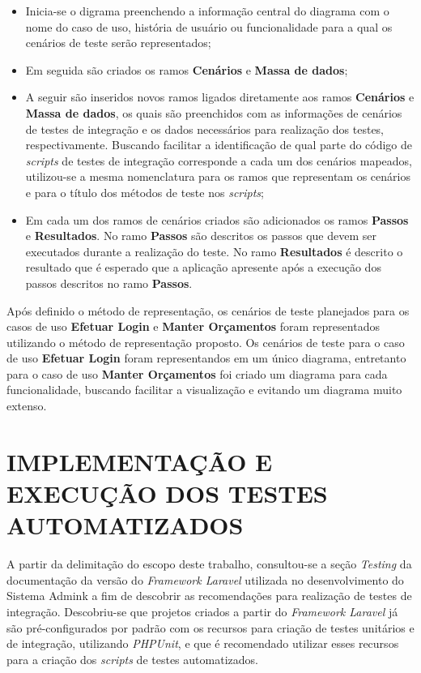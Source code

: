             \begin{itemize}
                \item Inicia-se o digrama preenchendo a informação central do diagrama com o nome do caso de uso, história de usuário ou funcionalidade para a qual os cenários de teste serão representados;
                \item Em seguida são criados os ramos \textbf{Cenários} e \textbf{Massa de dados};
                \item A seguir são inseridos novos ramos ligados diretamente aos ramos \textbf{Cenários} e \textbf{Massa de dados}, os quais são preenchidos com as informações de cenários de testes de integração e os dados necessários para realização dos testes, respectivamente. Buscando facilitar a identificação de qual parte do código de \emph{scripts} de testes de integração corresponde a cada um dos cenários mapeados, utilizou-se a mesma nomenclatura para os ramos que representam os cenários e para o título dos métodos de teste nos \emph{scripts};
                \item Em cada um dos ramos de cenários criados são adicionados os ramos \textbf{Passos} e \textbf{Resultados}. No ramo \textbf{Passos} são descritos os passos que devem ser executados durante a realização do teste. No ramo \textbf{Resultados} é descrito o resultado que é esperado que a aplicação apresente após a execução dos passos descritos no ramo \textbf{Passos}.
            \end{itemize}
        
            Após definido o método de representação, os cenários de teste planejados para os casos de uso \textbf{Efetuar Login} e \textbf{Manter Orçamentos} foram representados utilizando o método de representação proposto. Os cenários de teste para o caso de uso \textbf{Efetuar Login} foram representandos em um único diagrama, entretanto para o caso de uso \textbf{Manter Orçamentos} foi criado um diagrama para cada funcionalidade, buscando facilitar a visualização e evitando um diagrama muito extenso.
            
    \section{IMPLEMENTAÇÃO E EXECUÇÃO DOS TESTES AUTOMATIZADOS}
        A partir da delimitação do escopo deste trabalho, consultou-se a seção \emph{Testing} da documentação da versão do \emph{Framework Laravel} utilizada no desenvolvimento do Sistema Admink a fim de descobrir as recomendações para realização de testes de integração. Descobriu-se que projetos criados a partir do \emph{Framework Laravel} já são pré-configurados por padrão com os recursos para criação de testes unitários e de integração, utilizando \emph{PHPUnit}, e que é recomendado utilizar esses recursos para a criação dos \emph{scripts} de testes automatizados.
 
